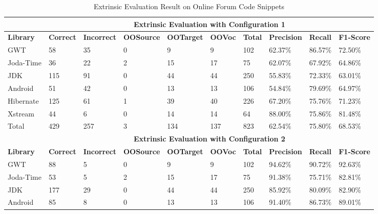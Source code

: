 \begin{table}[t]
\small
\centering
\caption{Extrinsic Evaluation Result on Online Forum Code Snippets}
\begin{tabular}{|l|l|l|l|l|l|l|l|l|l|}
\hline
          & \multicolumn{9}{c|}{\textbf{Extrinsic Evaluation with Configuration 1}}                             \\ \hline
\textbf{Library}   & \textbf{Correct} & \textbf{Incorrect} & \textbf{OOSource} & \textbf{OOTarget} & \textbf{OOVoc}  & \textbf{Total}   & \textbf{Precision} & \textbf{Recall}  & \textbf{F1-Score} \\ \hline
GWT       & 58      & 35        & 0        & 9        & 9     & 102   & 62.37\%   & 86.57\% & 72.50\%  \\ \hline
Joda-Time & 36      & 22        & 2        & 15       & 17    & 75    & 62.07\%   & 67.92\% & 64.86\%  \\ \hline
JDK       & 115     & 91        & 0        & 44       & 44    & 250   & 55.83\%   & 72.33\% & 63.01\%  \\ \hline
Android   & 51      & 42        & 0        & 13       & 13    & 106   & 54.84\%   & 79.69\% & 64.97\%  \\ \hline
Hibernate & 125     & 61        & 1        & 39       & 40    & 226   & 67.20\%   & 75.76\% & 71.23\%  \\ \hline
Xstream   & 44      & 6         & 0        & 14       & 14    & 64    & 88.00\%   & 75.86\% & 81.48\%  \\ \hline
Total     & 429     & 257       & 3        & 134      & 137   & 823   & 62.54\%   & 75.80\% & 68.53\%  \\ \hline
          & \multicolumn{9}{c|}{\textbf{Extrinsic Evaluation with Configuration 2}}                             \\ \hline
\textbf{Library}   & \textbf{Correct} & \textbf{Incorrect} & \textbf{OOSource} & \textbf{OOTarget} & \textbf{OOVoc}  & \textbf{Total}   & \textbf{Precision} & \textbf{Recall}  & \textbf{F1-Score} \\ \hline
GWT       & 88      & 5         & 0        & 9        & 9     & 102   & 94.62\%   & 90.72\% & 92.63\%  \\ \hline
Joda-Time & 53      & 5         & 2        & 15       & 17    & 75    & 91.38\%   & 75.71\% & 82.81\%  \\ \hline
JDK       & 177     & 29        & 0        & 44       & 44    & 250   & 85.92\%   & 80.09\% & 82.90\%  \\ \hline
Android   & 85      & 8         & 0        & 13       & 13    & 106   & 91.40\%   & 86.73\% & 89.01\%  \\ \hline

\end{tabular}
\end{table}

